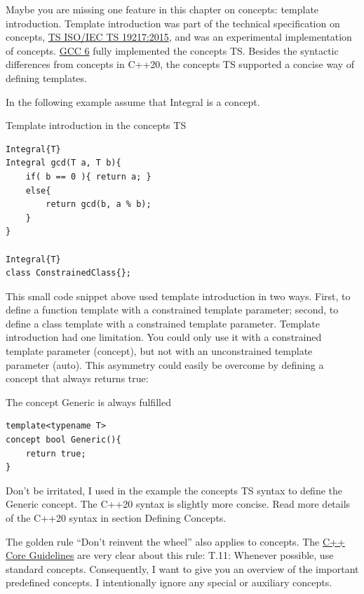 \begin{tcolorbox}[colback=blue!5!white,colframe=blue!75!black,title={What we don’t get: Template Introduction}]
Maybe you are missing one feature in this chapter on concepts: template introduction. Template introduction was part of the technical specification on concepts, \href{https://www.iso.org/standard/64031.html}{TS ISO/IEC TS 19217:2015}, and was an experimental implementation of concepts. \href{https://en.wikipedia.org/wiki/GNU_Compiler_Collection}{GCC 6} fully implemented the concepts TS. Besides the syntactic differences from concepts in C++20, the concepts TS supported a concise way of defining templates.

In the following example assume that Integral is a concept.

\noindent
Template introduction in the concepts TS
\begin{lstlisting}[style=styleCXX]
Integral{T}
Integral gcd(T a, T b){
	if( b == 0 ){ return a; }
	else{
		return gcd(b, a % b);
	}
}

Integral{T}
class ConstrainedClass{};
\end{lstlisting}

This small code snippet above used template introduction in two ways. First, to define a function template with a constrained template parameter; second, to define a class template with a constrained template parameter. Template introduction had one limitation. You could only use it with a constrained template parameter (concept), but not with an unconstrained template parameter (auto). This asymmetry could easily be overcome by defining a concept that always returns true: 

\noindent
The concept Generic is always fulfilled
\begin{lstlisting}[style=styleCXX]
template<typename T>
concept bool Generic(){
	return true;
}
\end{lstlisting}

Don’t be irritated, I used in the example the concepts TS syntax to define the Generic concept. The C++20 syntax is slightly more concise. Read more details of the C++20 syntax in section Defining Concepts.
\end{tcolorbox}


The golden rule “Don’t reinvent the wheel” also applies to concepts. The \href{https://isocpp.github.io/CppCoreGuidelines/CppCoreGuidelines}{C++ Core Guidelines} are very clear about this rule: T.11: Whenever possible, use standard concepts. Consequently, I want to give you an overview of the important predefined concepts. I intentionally ignore any special or auxiliary concepts.


